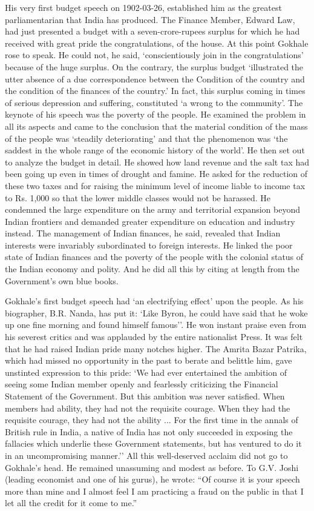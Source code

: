 His very first budget speech on 1902-03-26, established him as the greatest parliamentarian that India has produced. The Finance Member, Edward Law, had just presented a budget with a seven-crore-rupees surplus for which he had received with great pride the congratulations, of the house. At this point Gokhale rose to speak. He could not, he said, `conscientiously join in the congratulations' because of the huge surplus. On the contrary, the surplus budget `illustrated the utter absence of a due correspondence between the Condition of the country and the condition of the finances of the country.' In fact, this surplus coming in times of serious depression and suffering, constituted `a wrong to the community'. The keynote of his speech was the poverty of the people. He examined the problem in all its aspects and came to the conclusion that the material condition of the mass of the people was `steadily deteriorating' and that the phenomenon was `the saddest in the whole range of the economic history of the world'. He then set out to analyze the budget in detail. He showed how land revenue and the salt tax had been going up even in times of drought and famine. He asked for the reduction of these two taxes and for raising the minimum level of income liable to income tax to Rs. 1,000 so that the lower middle classes would not be harassed. He condemned the large expenditure on the army and territorial expansion beyond Indian frontiers and demanded greater expenditure on education and industry instead. The management of Indian finances, he said, revealed that Indian interests were invariably subordinated to foreign interests. He linked the poor state of Indian finances and the poverty of the people with the colonial status of the Indian economy and polity. And he did all this by citing at length from the Government's own blue books.

Gokhale's first budget speech had `an electrifying effect' upon the people. As his biographer, B.R. Nanda, has put it: `Like Byron, he could have said that he woke up one fine morning and found himself famous''. He won instant praise even from his severest critics and was applauded by the entire nationalist Press. It was felt that he had raised Indian pride many notches higher. The Amrita Bazar Patrika, which had missed no opportunity in the past to berate and belittle him, gave unstinted expression to this pride: `We had ever entertained the ambition of seeing some Indian member openly and fearlessly criticizing the Financial Statement of the Government. But this ambition was never satisfied. When members had ability, they had not the requisite courage. When they had the requisite courage, they had not the ability ... For the first time in the annals of British rule in India, a native of India has not only succeeded in exposing the fallacies which underlie these Government statements, but has ventured to do it in an uncompromising manner.'' All this well-deserved acclaim did not go to Gokhale's head. He remained unassuming and modest as before. To G.V. Joshi (leading economist and one of his gurus), he wrote: ``Of course it is your speech more than mine and I almost feel I am practicing a fraud on the public in that I let all the credit for it come to me.''

